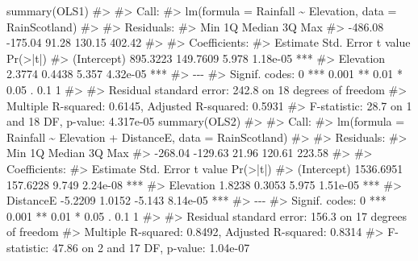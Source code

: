 \documentclass[
  letterpaper,
  DIV=11,
  numbers=noendperiod]{scrreprt}
\newenvironment{Shaded}{\begin{snugshade}}{\end{snugshade}}
\newcommand{\CommentTok}[1]{\textcolor[rgb]{0.37,0.37,0.37}{#1}}
\newcommand{\FunctionTok}[1]{\textcolor[rgb]{0.28,0.35,0.67}{#1}}
\newcommand{\NormalTok}[1]{\textcolor[rgb]{0.00,0.23,0.31}{#1}}
\begin{document}
\begin{Shaded}
\begin{Highlighting}[]
\FunctionTok{summary}\NormalTok{(OLS1)}
\CommentTok{\#\textgreater{} }
\CommentTok{\#\textgreater{} Call:}
\CommentTok{\#\textgreater{} lm(formula = Rainfall \textasciitilde{} Elevation, data = RainScotland)}
\CommentTok{\#\textgreater{} }
\CommentTok{\#\textgreater{} Residuals:}
\CommentTok{\#\textgreater{}     Min      1Q  Median      3Q     Max }
\CommentTok{\#\textgreater{} {-}486.08 {-}175.04   91.28  130.15  402.42 }
\CommentTok{\#\textgreater{} }
\CommentTok{\#\textgreater{} Coefficients:}
\CommentTok{\#\textgreater{}             Estimate Std. Error t value Pr(\textgreater{}|t|)    }
\CommentTok{\#\textgreater{} (Intercept) 895.3223   149.7609   5.978 1.18e{-}05 ***}
\CommentTok{\#\textgreater{} Elevation     2.3774     0.4438   5.357 4.32e{-}05 ***}
\CommentTok{\#\textgreater{} {-}{-}{-}}
\CommentTok{\#\textgreater{} Signif. codes:  0 \textquotesingle{}***\textquotesingle{} 0.001 \textquotesingle{}**\textquotesingle{} 0.01 \textquotesingle{}*\textquotesingle{} 0.05 \textquotesingle{}.\textquotesingle{} 0.1 \textquotesingle{} \textquotesingle{} 1}
\CommentTok{\#\textgreater{} }
\CommentTok{\#\textgreater{} Residual standard error: 242.8 on 18 degrees of freedom}
\CommentTok{\#\textgreater{} Multiple R{-}squared:  0.6145, Adjusted R{-}squared:  0.5931 }
\CommentTok{\#\textgreater{} F{-}statistic:  28.7 on 1 and 18 DF,  p{-}value: 4.317e{-}05}
\FunctionTok{summary}\NormalTok{(OLS2)}
\CommentTok{\#\textgreater{} }
\CommentTok{\#\textgreater{} Call:}
\CommentTok{\#\textgreater{} lm(formula = Rainfall \textasciitilde{} Elevation + DistanceE, data = RainScotland)}
\CommentTok{\#\textgreater{} }
\CommentTok{\#\textgreater{} Residuals:}
\CommentTok{\#\textgreater{}     Min      1Q  Median      3Q     Max }
\CommentTok{\#\textgreater{} {-}268.04 {-}129.63   21.96  120.61  223.58 }
\CommentTok{\#\textgreater{} }
\CommentTok{\#\textgreater{} Coefficients:}
\CommentTok{\#\textgreater{}              Estimate Std. Error t value Pr(\textgreater{}|t|)    }
\CommentTok{\#\textgreater{} (Intercept) 1536.6951   157.6228   9.749 2.24e{-}08 ***}
\CommentTok{\#\textgreater{} Elevation      1.8238     0.3053   5.975 1.51e{-}05 ***}
\CommentTok{\#\textgreater{} DistanceE     {-}5.2209     1.0152  {-}5.143 8.14e{-}05 ***}
\CommentTok{\#\textgreater{} {-}{-}{-}}
\CommentTok{\#\textgreater{} Signif. codes:  0 \textquotesingle{}***\textquotesingle{} 0.001 \textquotesingle{}**\textquotesingle{} 0.01 \textquotesingle{}*\textquotesingle{} 0.05 \textquotesingle{}.\textquotesingle{} 0.1 \textquotesingle{} \textquotesingle{} 1}
\CommentTok{\#\textgreater{} }
\CommentTok{\#\textgreater{} Residual standard error: 156.3 on 17 degrees of freedom}
\CommentTok{\#\textgreater{} Multiple R{-}squared:  0.8492, Adjusted R{-}squared:  0.8314 }
\CommentTok{\#\textgreater{} F{-}statistic: 47.86 on 2 and 17 DF,  p{-}value: 1.04e{-}07}
\end{Highlighting}
\end{Shaded}
\end{document}
